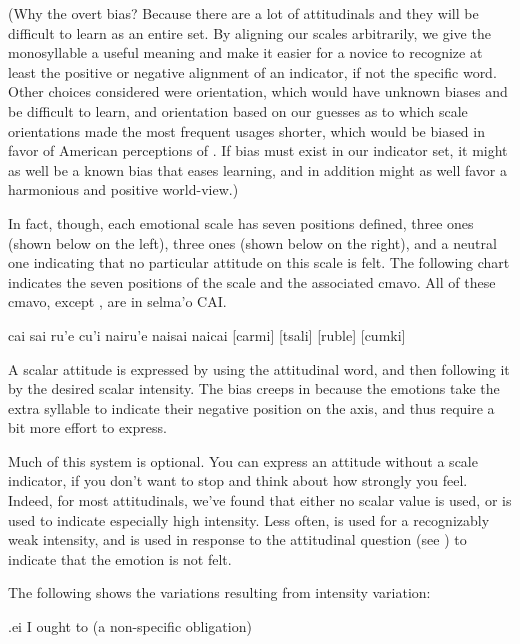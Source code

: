 (Why the overt bias? Because there are a lot of attitudinals
    and they will be difficult to learn as an entire set. By
    aligning our scales arbitrarily, we give the monosyllable
     a useful meaning and make it easier for a novice to
    recognize at least the positive or negative alignment of an
    indicator, if not the specific word. Other choices considered
    were  orientation, which would have unknown biases
    and be difficult to learn, and orientation based on our guesses
    as to which scale orientations made the most frequent usages
    shorter, which would be biased in favor of American perceptions
    of . If bias must exist in our indicator set, it
    might as well be a known bias that eases learning, and in
    addition might as well favor a harmonious and positive
    world-view.)

In fact, though, each emotional scale has seven positions
    defined, three  ones (shown below on the left),
    three  ones (shown below on the right), and a
    neutral one indicating that no particular attitude on this
    scale is felt. The following chart indicates the seven
    positions of the scale and the associated cmavo. All of these
    cmavo, except , are in selma'o CAI.

 cai     sai     ru'e   cu'i   nairu'e naisai  naicai
    [carmi] [tsali] [ruble] [cumki]

A scalar attitude is expressed by using the attitudinal word,
    and then following it by the desired scalar intensity. The bias
    creeps in because the  emotions take the extra
    syllable  to indicate their negative position on the
    axis, and thus require a bit more effort to express. 

Much of this system is optional. You can express an attitude
    without a scale indicator, if you don't want to stop and think
    about how strongly you feel. Indeed, for most attitudinals,
    we've found that either no scalar value is used, or  is
    used to indicate especially high intensity. Less often,
     is used for a recognizably weak intensity, and
     is used in response to the attitudinal question
     (see ) to indicate that
    the emotion is not felt.

The following shows the variations resulting from intensity
    variation:
\begin{example}
.ei\n
I ought to\n
(a non-specific obligation)
\end{example}


